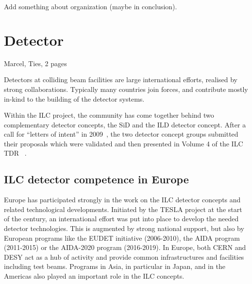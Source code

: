 \documentclass[%
 reprint,
 amsmath,amssymb,
 aps,
]{revtex4-1}
\begin{document}
Add something about organization (maybe in conclusion).

\section{\label{sec:det}Detector}
Marcel, Ties, 2 pages

Detectors at colliding beam facilities are large international efforts, realised by strong collaborations. 
Typically many countries join forces, and contribute mostly in-kind to the building of the detector systems. 

Within the ILC project, the community has come together behind two complementary detector concepts, the SiD and the ILD detector concept. 
After a call for ``letters of intent'' in 2009~\cite{Aihara:2009ad,Abe:2010aa}, the two detector concept groups submitted their proposals 
which were validated and then presented in Volume 4 of the ILC TDR ~\cite{Behnke:2013lya}.

\subsection{ILC detector competence in Europe~\label{sec:det:competence}}
Europe has participated strongly in the work on the ILC detector concepts and 
related technological developments. Initiated by the TESLA project at the start 
of the century, an international effort was put into place to develop the needed 
detector technologies. This is augmented by strong national support, but also by 
European programs like the EUDET initiative (2006-2010), the AIDA program 
(2011-2015) or the AIDA-2020 program (2016-2019). In Europe, both CERN and DESY 
act as a hub of activity and provide common infrastructures and facilities 
including test beams. Programs in Asia, in particular in Japan, and in the 
Americas also played an important role in the ILC concepts. 

\end{document}
